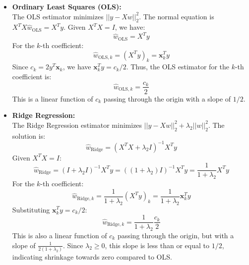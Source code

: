 \documentclass[11pt, a4paper, oneside]{memoir}
\begin{document}
\begin{itemize}
    \item \textbf{Ordinary Least Squares (OLS):} \\
          The OLS estimator minimizes $||y - Xw||_2^2$. The normal equation is $X^T X \hat{w}_{\text{OLS}} = X^T y$.
          Given $X^T X = I$, we have:
          \[ \hat{w}_{\text{OLS}} = X^T y \]
          For the $k$-th coefficient\footnotemark :
          \[ \hat{w}_{\text{OLS},k} = (X^T y)_k = \mathbf{x}_k^T y \]
          Since $c_k = 2 y^T \mathbf{x}_k$, we have $\mathbf{x}_k^T y = c_k / 2$.
          Thus, the OLS estimator for the $k$-th coefficient is:
          \[ \hat{w}_{\text{OLS},k} = \frac{c_k}{2} \]
          This is a linear function of $c_k$ passing through the origin with a slope of $1/2$.

    \item \textbf{Ridge Regression:} \\
          The Ridge Regression estimator minimizes $||y - Xw||_2^2 + \lambda_2 ||w||_2^2$. The solution is:
          \[ \hat{w}_{\text{Ridge}} = (X^T X + \lambda_2 I)^{-1} X^T y \]
          Given $X^T X = I$:
          \[ \hat{w}_{\text{Ridge}} = (I + \lambda_2 I)^{-1} X^T y = ((1 + \lambda_2) I)^{-1} X^T y = \frac{1}{1 + \lambda_2} X^T y \]
          For the $k$-th coefficient:
          \[ \hat{w}_{\text{Ridge},k} = \frac{1}{1 + \lambda_2} (X^T y)_k = \frac{1}{1 + \lambda_2} \mathbf{x}_k^T y \]
          Substituting $\mathbf{x}_k^T y = c_k / 2$:
          \[ \hat{w}_{\text{Ridge},k} = \frac{1}{1 + \lambda_2} \frac{c_k}{2} \]
          This is also a linear function of $c_k$ passing through the origin, but with a slope of $\frac{1}{2(1 + \lambda_2)}$.
          Since $\lambda_2 \ge 0$, this slope is less than or equal to $1/2$, indicating shrinkage towards zero compared to OLS.


\end{itemize}
\end{document}
